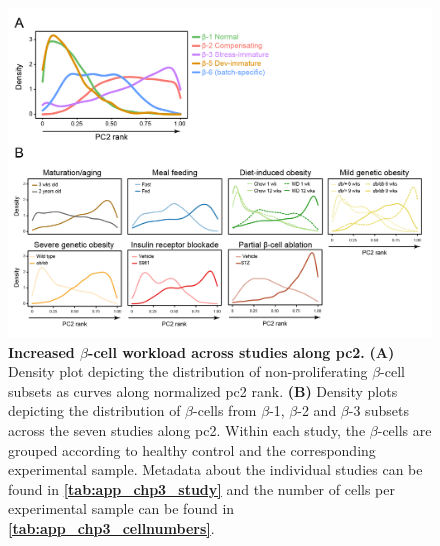 \begin{figure}[H]
\centering
\includegraphics[width=\linewidth]{Appendix2/Fig/F3-7-03.png}
\caption[Increased $\beta$-cell workload across studies along 2]{\textbf{Increased $\beta$-cell workload across studies along \gls{pc}2.} \textbf{(A)} Density plot depicting the distribution of non-proliferating $\beta$-cell subsets as curves along normalized \gls{pc}2 rank. \textbf{(B)} Density plots depicting the distribution of $\beta$-cells from $\beta$-1, $\beta$-2 and $\beta$-3 subsets across the seven studies along \gls{pc}2. Within each study, the $\beta$-cells are grouped according to healthy control and the corresponding experimental sample. Metadata about the individual studies can be found in \textbf{\autoref{tab:app_chp3_study}} and the number of cells per experimental sample can be found in \textbf{\autoref{tab:app_chp3_cellnumbers}}.}
\label{fig:app_chp3_pc2}
\end{figure}


